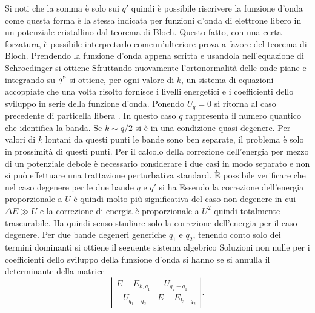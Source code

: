 Si noti che la somma è solo sui $q'$ quindi è possibile riscrivere la funzione d'onda come
questa forma è la stessa indicata per funzioni d'onda di elettrone libero in un potenziale cristallino dal teorema di Bloch. Questo fatto, con una certa forzatura, è possibile interpretarlo comeun'ulteriore prova a favore del teorema di Bloch. Prendendo la funzione d'onda appena scritta e usandola nell'equazione di Schroedinger si ottiene
Sfruttando nuovamente l'ortonormalità delle onde piane e integrando su $q"$ si ottiene, per ogni valore di $k$, un sistema di equazioni accoppiate
che una volta risolto fornisce i livelli energetici e i coefficienti dello sviluppo in serie della funzione d'onda. Ponendo $U_q=0$ si ritorna al caso precedente di particella libera
.
In questo caso $q$ rappresenta il numero quantico che identifica la banda. Se $k \sim q/2$ si è in una condizione quasi degenere. Per valori di $k$ lontani da questi punti le bande sono ben separate, il problema è solo in prossimità di questi punti. Per il calcolo della correzione dell'energia per mezzo di un potenziale debole è necessario considerare i due casi in modo separato e non si può effettuare una trattazione perturbativa standard. \`E possibile verificare che nel caso degenere per le due bande $q$ e $q'$ si ha 
Essendo la correzione dell'energia proporzionale a $U$  è quindi molto più significativa del caso non degenere in cui $\Delta E\gg U$ e la correzione di energia è proporzionale a $U^2$ quindi totalmente trascurabile. Ha quindi senso studiare solo la correzione dell'energia per il caso degenere.
Per due bande degeneri generiche $q_1$ e $q_2$, tenendo conto solo dei termini dominanti si ottiene il seguente sistema algebrico
Soluzioni non nulle per i coefficienti dello sviluppo della funzione d'onda si hanno se si annulla il determinante della matrice
\[ \left| \begin{array}{cc}
E-E_{k,q_1} & -U_{q_2-q_1}  \\
-U_{q_1-q_2} & E-E_{k-q_2} \end{array} \right|.\]
